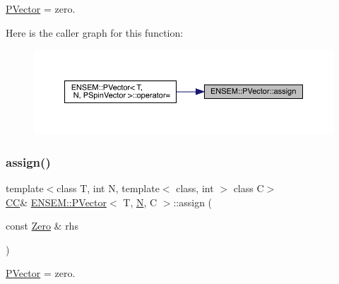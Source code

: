 \mbox{\hyperlink{classENSEM_1_1PVector}{P\+Vector}} = zero. 

Here is the caller graph for this function\+:
\nopagebreak
\begin{figure}[H]
\begin{center}
\leavevmode
\includegraphics[width=350pt]{da/d9c/classENSEM_1_1PVector_a2dec9eb5015ac1a8a261a20c08d9650c_icgraph}
\end{center}
\end{figure}
\mbox{\label{classENSEM_1_1PVector_a2dec9eb5015ac1a8a261a20c08d9650c}} 
\subsubsection{\texorpdfstring{assign()}{assign()}\hspace{0.1cm}{\footnotesize\ttfamily [2/6]}}
{\footnotesize\ttfamily template$<$class T, int N, template$<$ class, int $>$ class C$>$ \\
\mbox{\hyperlink{classENSEM_1_1PVector_a92dc0a0a301a3dc96f7be5d337019bc7}{CC}}\& \mbox{\hyperlink{classENSEM_1_1PVector}{E\+N\+S\+E\+M\+::\+P\+Vector}}$<$ T, \mbox{\hyperlink{adat__devel_2lib_2hadron_2operator__name__util_8cc_a7722c8ecbb62d99aee7ce68b1752f337}{N}}, C $>$\+::assign (\begin{DoxyParamCaption}\item[{const \mbox{\hyperlink{structENSEM_1_1Zero}{Zero}} \&}]{rhs }\end{DoxyParamCaption})\hspace{0.3cm}{\ttfamily [inline]}}



\mbox{\hyperlink{classENSEM_1_1PVector}{P\+Vector}} = zero. 

\mbox{\label{classENSEM_1_1PVector_a2dec9eb5015ac1a8a261a20c08d9650c}} 
